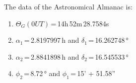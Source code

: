 The data of the Astronomical Almanac is: 

\begin{enumerate}
    \item $\Theta_G(0UT)$\,=\,14h\,52m\,28.7584s
    \item $\alpha_1$\,=\,2.8197997\,h and $\delta_1$\,=\,16.262748\,°
    \item $\alpha_2$\,=\,2.8841898\,h and $\delta_2$\,=\,16.545533\,°
    \item $\phi_2$\,=\,8.72\,° and $\phi_1$\,=\,15' + 51.58''
\end{enumerate}


%
%
